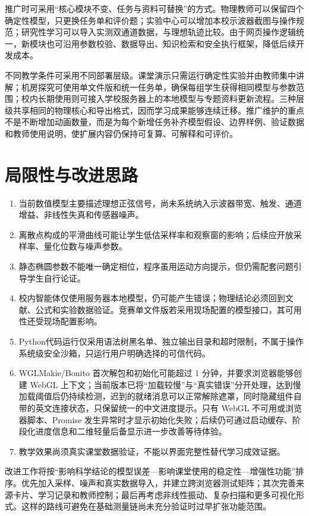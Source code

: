 \documentclass[UTF8,a4paper,zihao=-4]{ctexart}
\begin{document}
推广时可采用“核心模块不变、任务与资料可替换”的方式。物理教师可以保留四个确定性模型，只更换任务单和评价题；实验中心可以增加本校示波器截图与操作规范；研究性学习可以导入实测双通道数据，与理想轨迹比较。由于网页操作逻辑统一，新模块也可沿用参数校验、数据导出、知识检索和安全执行框架，降低后续开发成本。

不同教学条件可采用不同部署层级。课堂演示只需运行确定性实验并由教师集中讲解；机房探究可使用单文件版和统一任务单，确保每组学生获得相同模型与参数范围；校内长期使用则可接入学校服务器上的本地模型与专题资料更新流程。三种层级共享相同的物理核心和导出格式，因而学习成果能够连续迁移。推广维护的重点不是不断增加动画数量，而是为每个新增任务补齐模型假设、边界样例、验证数据和教师使用说明，使扩展内容仍保持可复算、可解释和可评价。

\section{局限性与改进思路}

\begin{enumerate}
  \item 当前数值模型主要描述理想正弦信号，尚未系统纳入示波器带宽、触发、通道增益、非线性失真和传感器噪声。
  \item 离散点构成的平滑曲线可能让学生低估采样率和观察窗的影响；后续应开放采样率、量化位数与噪声参数。
  \item 静态椭圆参数不能唯一确定相位，程序虽用运动方向提示，但仍需配套问题引导学生自行论证。
  \item 校内智能体仅使用服务器本地模型，仍可能产生错误；物理结论必须回到文献、公式和实验数据验证。竞赛单文件版若采用现场配置的模型接口，其可用性还受现场配置影响。
  \item Python代码运行仅采用语法树黑名单、独立输出目录和超时限制，不属于操作系统级安全沙箱，只运行用户明确选择的可信代码。
  \item WGLMakie/Bonito 首次解包和初始化可能超过 1 分钟，并要求浏览器能够创建 WebGL 上下文；当前版本已将“加载较慢”与“真实错误”分开处理，达到慢加载阈值后仍持续检测，迟到的就绪消息可以正常解除遮罩，同时隐藏组件自带的英文连接状态，只保留统一的中文进度提示。只有 WebGL 不可用或浏览器脚本、Promise 发生异常时才显示初始化失败；后续仍可通过启动缓存、阶段化进度信息和二维轻量后备显示进一步改善等待体验。
  \item 教学效果尚须真实课堂数据验证，不能以界面完整性替代学习成效证据。
\end{enumerate}

改进工作将按“影响科学结论的模型误差—影响课堂使用的稳定性—增强性功能”排序。优先加入采样、噪声和真实数据导入，并建立跨浏览器测试矩阵；其次完善来源卡片、学习记录和教师控制；最后再考虑非线性振动、复杂扫描和更多可视化形式。这样的路线可避免在基础测量链尚未充分验证时过早扩张功能范围。
\end{document}

